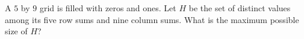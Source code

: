 A $5$ by $9$ grid is filled with zeros and ones. Let $H$ be the set of distinct values among its five row sums and nine column sums. What is the maximum possible size of $H$?
